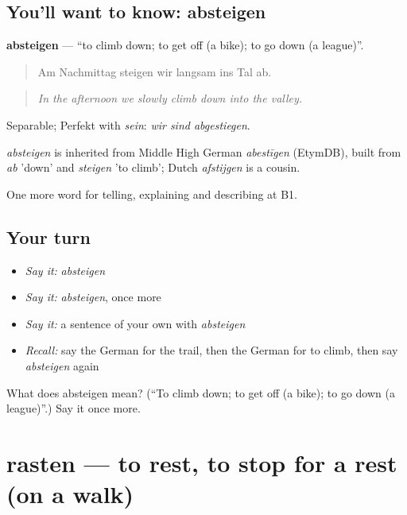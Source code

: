 \subsection*{You'll want to know: absteigen}
\textbf{absteigen} — \textquotedblleft{}to climb down; to get off (a bike); to go down (a league)\textquotedblright{}.

\begin{quote}
Am Nachmittag steigen wir langsam ins Tal ab.
\end{quote}

\begin{quote}
\emph{In the afternoon we slowly climb down into the valley.}
\end{quote}

Separable; Perfekt with \emph{sein}: \emph{wir sind abgestiegen}.

\begin{cousinweb}
\emph{absteigen} is inherited from Middle High German \emph{abestīgen} (EtymDB), built from \emph{ab} 'down' and \emph{steigen} 'to climb'; Dutch \emph{afstijgen} is a cousin.
\end{cousinweb}

\begin{grammarlens}[title={What you've built}]
One more word for telling, explaining and describing at B1.
\end{grammarlens}

\subsection*{Your turn}
\begin{itemize}
\raggedright
  \item \emph{Say it:} \emph{absteigen}
  \item \emph{Say it:} \emph{absteigen}, once more
  \item \emph{Say it:} a sentence of your own with \emph{absteigen}
  \item \emph{Recall:} say the German for the trail, then the German for to climb, then say \emph{absteigen} again
\end{itemize}

\begin{tcolorbox}[breakable,colback=teal!4,colframe=teal!35!black,title={Before you move on}]
What does absteigen mean? (\textquotedblleft{}To climb down; to get off (a bike); to go down (a league)\textquotedblright{}.) Say it once more.
\end{tcolorbox}
\section[rasten]{rasten — to rest, to stop for a rest (on a walk)}

